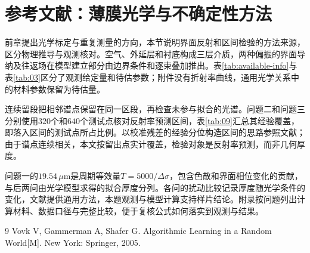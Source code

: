 \section{参考文献：薄膜光学与不确定性方法}
\label{sec:references}

前章提出光学标定与重复测量的方向，本节说明界面反射和区间检验的方法来源，区分物理推导与观测核对。空气、外延层和衬底构成三层介质，两种偏振的界面导纳及往返场在模型建立部分由边界条件和逐束叠加推出。表\ref{tab:available-info}与表\ref{tab:03}区分了观测给定量和待估参数；附件没有折射率曲线，通用光学关系中的材料参数保留为待估量。

连续留段把相邻谱点保留在同一区段，再检查未参与拟合的光谱。问题二和问题三分别使用$320$个和$640$个测试点核对反射率预测区间，表\ref{tab:09}汇总其经验覆盖，即落入区间的测试点所占比例。以校准残差的经验分位构造区间的思路参照文献\cite{vovk2005conformal}；由于谱点连续相关，本文按留出点实计覆盖，检验对象是反射率预测，而非几何厚度。

问题一的$19.54\,\mu\mathrm{m}$是周期等效量$T=5000/\Delta\sigma$，包含色散和界面相位变化的贡献，与后两问由光学模型求得的拟合厚度分列。各问的扰动比较记录厚度随光学条件的变化，文献提供通用方法，本题观测与模型计算支持样片结论。附录按问题列出计算材料、数据口径与完整比较，便于复核公式如何落实到观测与结果。

\begingroup
\renewcommand{\addcontentsline}[3]{}
\begin{thebibliography}{9}
 Vovk V, Gammerman A, Shafer G. Algorithmic Learning in a Random World[M]. New York: Springer, 2005.
\end{thebibliography}
\endgroup
